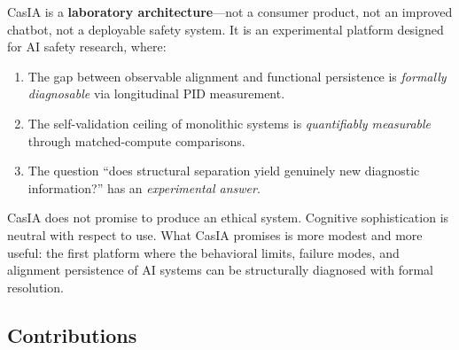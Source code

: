 \documentclass[11pt,a4paper]{article}
\theoremstyle{definition}
\begin{document}
CasIA is a \textbf{laboratory architecture}---not a consumer product, not an improved chatbot, not a deployable safety system. It is an experimental platform designed for AI safety research, where:
\begin{enumerate}[leftmargin=*,itemsep=3pt]
\item The gap between observable alignment and functional persistence is \emph{formally diagnosable} via longitudinal PID measurement.
\item The self-validation ceiling of monolithic systems is \emph{quantifiably measurable} through matched-compute comparisons.
\item The question ``does structural separation yield genuinely new diagnostic information?'' has an \emph{experimental answer}.
\end{enumerate}

CasIA does not promise to produce an ethical system. Cognitive sophistication is neutral with respect to use. What CasIA promises is more modest and more useful: the first platform where the behavioral limits, failure modes, and alignment persistence of AI systems can be structurally diagnosed with formal resolution.

\subsection{Contributions}
\end{document}
